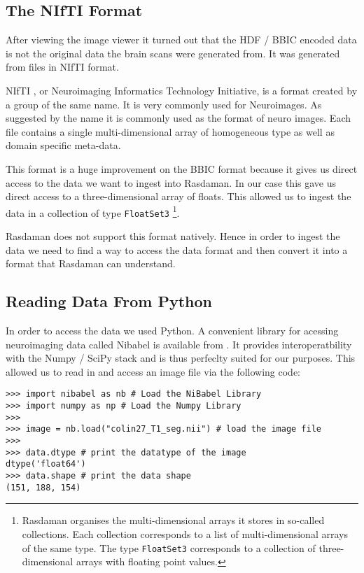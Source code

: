 \label{sec:ingestion}

\subsection{The NIfTI Format}

After viewing the image viewer it turned out that the HDF / BBIC encoded data is not the original data the brain scans were generated from. It was generated from files in NIfTI format.

NIfTI \cite{NIfTI:website}, or Neuroimaging Informatics Technology Initiative, is a format created by a group of the same name. It is very commonly used for Neuroimages. As suggested by the name it is commonly used as the format of neuro images. Each file contains a single multi-dimensional array of homogeneous type as well as domain specific meta-data.

This format is a huge improvement on the BBIC format because it gives us direct access to the data we want to ingest into Rasdaman. In our case this gave us direct access to a three-dimensional array of floats. This allowed us to ingest the data in a collection of type \lstinline{FloatSet3} \footnote{Rasdaman organises the multi-dimensional arrays it stores in so-called collections. Each collection corresponds to a list of multi-dimensional arrays of the same type. The type \lstinline{FloatSet3} corresponds to a collection of three-dimensional arrays with floating point values. }.

Rasdaman does not support this format natively. Hence in order to ingest the data we need to find a way to access the data format and then convert it into a format that Rasdaman can understand.

\subsection{Reading Data From Python}

In order to access the data we used Python. A convenient library for acessing neuroimaging data called Nibabel is available from \cite{Nibabel:website}. It provides interoperatbility with the Numpy / SciPy stack and is thus perfeclty suited for our purposes. This allowed us to read in and access an image file via the following code:
\begin{lstlisting}
>>> import nibabel as nb # Load the NiBabel Library
>>> import numpy as np # Load the Numpy Library
>>>
>>> image = nb.load("colin27_T1_seg.nii") # load the image file
>>>
>>> data.dtype # print the datatype of the image
dtype('float64')
>>> data.shape # print the data shape
(151, 188, 154)
\end{lstlisting}

